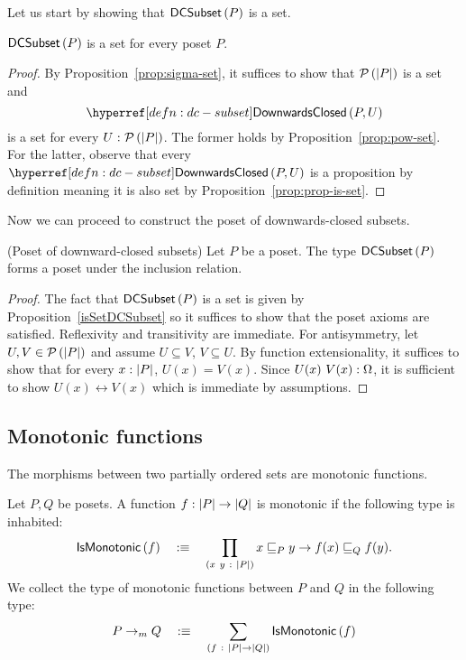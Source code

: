 Let us start by showing that $\mathsf{DCSubset}{}\left(P\right)$ is a set.
\begin{prop}\label{isSetDCSubset}
  $\mathsf{DCSubset}{}\left(P\right)$ is a set for every poset $P$.
\end{prop}
\begin{proof}
  By Proposition~\ref{prop:sigma-set}, it suffices to show that $\mathcal{P}\left(\left| P \right|\right)$ is a set
  and $$\isdc{P, U}$$ is a set for every $U\hspace{0.1mm}:\hspace{0.1mm}\mathcal{P}\left(\left| P \right|\right)$. The former holds by
  Proposition~\ref{prop:pow-set}. For the latter, observe that every $\isdc{P, U}$ is a
  proposition by definition meaning it is also set by Proposition~\ref{prop:prop-is-set}.
\end{proof}

Now we can proceed to construct the poset of downwards-closed subsets.
\begin{thm}(Poset of downward-closed subsets)\label{thm:dc-poset}
  Let $P$ be a poset. The type $\mathsf{DCSubset}{}\left(P\right)$ forms a poset under the
  inclusion relation.
\end{thm}
\begin{proof}
  The fact that $\mathsf{DCSubset}{}\left(P\right)$ is a set is given by Proposition~\ref{isSetDCSubset} so it
  suffices to show that the poset axioms are satisfied. Reflexivity and transitivity are
  immediate. For antisymmetry, let $U, V \in \mathcal{P}\left(\left| P \right|\right)$ and assume $U \subseteq V$, $V \subseteq U$. By
  function extensionality, it suffices to show that for every $x : \left| P \right|$, $U(x) =
  V(x)$. Since $U(x)~V(x):\Omega$, it is sufficient to show $U(x) \leftrightarrow V(x)$ which is
  immediate
  by assumptions.
\end{proof}

\subsection{Monotonic functions}

The morphisms between two partially ordered sets are monotonic functions.

\begin{defn}
  Let $P, Q$ be posets. A function $f : \left| P \right| \rightarrow \left| Q \right|$ is monotonic if the following
  type is inhabited:
  \begin{equation*}
    \mathsf{IsMonotonic}{}\left(f\right) \quad:\equiv\quad \prod_{(x~y~:~\left| P \right|)} x \sqsubseteq_P y \rightarrow f(x) \sqsubseteq_Q f(y).
  \end{equation*}
  We collect the type of monotonic functions between $P$ and $Q$ in the following type:
  \begin{equation*}
    P \rightarrow_m Q \quad:\equiv\quad \sum_{(f~:~\left| P \right| \rightarrow \left| Q \right|)} \mathsf{IsMonotonic}{}\left(f\right)
  \end{equation*}
\end{defn}

